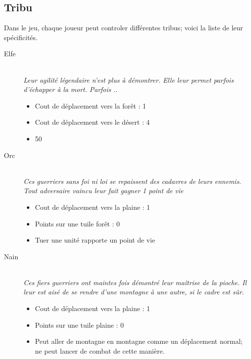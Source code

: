 	\subsection{Tribu}
		Dans le jeu, chaque joueur peut controler différentes tribus; voici la liste de leur spécificités.
		\begin{description}
			\item[Elfe] \hfill \\
				\textit{Leur agilité légendaire n'est plus à démontrer. Elle leur permet parfois d'échapper à la mort. Parfois ..} \\
				\begin{itemize}
					\item Cout de déplacement vers la forêt : 1
					\item Cout de déplacement vers le désert : 4
					\item 50%
				\end{itemize}
			\item[Orc] \hfill \\
				\textit{Ces guerriers sans foi ni loi se repaissent des cadavres de leurs ennemis. Tout adversaire vaincu leur fait gagner 1 point de vie} \\
				\begin{itemize}
					\item Cout de déplacement vers la plaine : 1
					\item Points sur une tuile forêt : 0
					\item Tuer une unité rapporte un point de vie
				\end{itemize}
			\item[Nain] \hfill \\
				\textit{Ces fiers guerriers ont maintes fois démontré leur maîtrise de la pioche. Il leur est aisé de se rendre d'une montagne à une autre, si le cadre est sûr.} \\
				\begin{itemize}
					\item Cout de déplacement vers la plaine : 1
					\item Points sur une tuile plaine : 0
					\item Peut aller de montagne en montagne comme un déplacement normal; ne peut lancer de combat de cette manière.
				\end{itemize}
		\end{description}